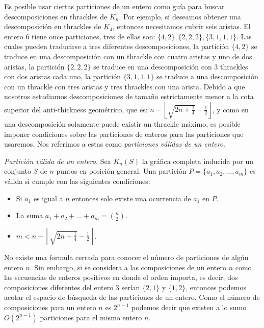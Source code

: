     Es posible usar ciertas particiones de un entero como guía para buscar
    descomposiciones en thrackles de $K_n$. Por ejemplo, si  deseamos obtener
    una descomposición en thrackles de $K_4$, entonces necesitamos cubrir
    seis aristas. El entero 6 tiene once particiones, tres de ellas son:
    $\{4,2\},\{2,2,2\},\{3,1,1,1\}$. Las cuales pueden traducirse a tres diferentes
    descomposiciones, la partición $\{4,2\}$ se traduce en una descomposición
    con un thrackle con cuatro aristas y uno de dos aristas, la partición
    $\{2,2,2\}$ se traduce en una descomposición con 3 thrackles con dos
    aristas cada uno, la partición $\{3,1,1,1\}$ se traduce a una descomposición
    con un thrackle con tres aristas y tres thrackles con una arista. Debido a que
    nosotros estudiamos descomposiciones de tamaño estrictamente menor
    a la cota superior del anti-thickness geométrico, que es:
    $n - \left\lfloor\sqrt{2n+\frac{1}{4}} - \frac{1}{2}\right\rfloor$, y
    como en una descomposición solamente puede existir un thrackle máximo, es
    posible imponer condiciones sobre las particiones de enteros para
    las particiones que usaremos. Nos referimos a estas como
    \emph{particiones válidas de un entero}.
    \begin{definition}{\emph{Partición válida de un entero.}}
      Sea $K_n(S)$ la gráfica completa inducida por un conjunto $S$ de $n$
      puntos en posición general.
      Una partición $P=\{a_1,a_2,\dots,a_m\}$ es válida si cumple
      con las siguientes condiciones:
      \begin{itemize}
        \item Si $a_1$ es igual a $n$ entonces solo existe una ocurrencia de $a_1$ en $P$.
        \item La suma $a_1 + a_2 + \dots + a_m = \binom{n}{2}$.
        \item $m < n - \left\lfloor\sqrt{2n+\frac{1}{4}} - \frac{1}{2}\right\rfloor$.
      \end{itemize}
    \end{definition}

    No existe una formula cerrada para conocer el número de particiones de
    algún entero $n$. Sin embargo, si se considera a las composiciones
    de un entero $n$ como las secuencias de enteros positivos en donde el orden
    importa, es decir, dos composiciones diferentes del entero 3 serían $\{2,1\}$
    y $\{1,2\}$, entonces podemos acotar el espacio de búsqueda de las particiones
    de un entero. Como el número de composiciones para un entero $n$ es $2^{n-1}$
    podemos decir que existen a lo sumo $O(2^{n-1})$ particiones para el
    mismo entero $n$.

